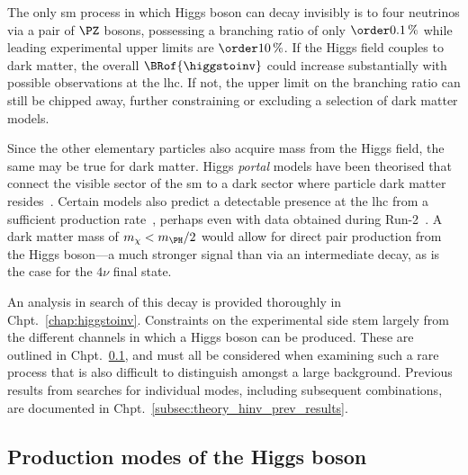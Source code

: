 The only \acrshort{sm} process in which Higgs boson can decay invisibly is to four neutrinos via a pair of $\PZ$ bosons, possessing a branching ratio of only $\order{\text{0.1\,\%}}$ while leading experimental upper limits are $\order{\text{10\,\%}}$. If the Higgs field couples to dark matter, the overall $\BRof{\higgstoinv}$ could increase substantially with possible observations at the \acrshort{lhc}. If not, the upper limit on the branching ratio can still be chipped away, further constraining or excluding a selection of dark matter models. 

Since the other elementary particles also acquire mass from the Higgs field, the same may be true for dark matter. Higgs \emph{portal} models have been theorised that connect the visible sector of the \acrlong{sm} to a dark sector where particle dark matter resides~\cite{higgs_portal_singlet_dm,Arcadi:2019lka}. Certain models also predict a detectable presence at the \acrshort{lhc} from a sufficient production rate~\cite{Boveia:2018yeb}, perhaps even with data obtained during Run-2~\cite{Abercrombie:2015wmb}. A dark matter mass of $m_{\chi} < m_{\PH}/\text{2}$ would allow for direct pair production from the Higgs boson---a much stronger signal than via an intermediate decay, as is the case for the $\text{4}\nu$ final state.


An analysis in search of this decay is provided thoroughly in Chpt.~\ref{chap:higgstoinv}. Constraints on the experimental side stem largely from the different channels in which a Higgs boson can be produced. These are outlined in Chpt.~\ref{subsec:theory_higgs_production_modes}, and must all be considered when examining such a rare process that is also difficult to distinguish amongst a large background. Previous results from searches for individual modes, including subsequent combinations, are documented in Chpt.~\ref{subsec:theory_hinv_prev_results}.




\subsection{Production modes of the Higgs boson}
\label{subsec:theory_higgs_production_modes}

